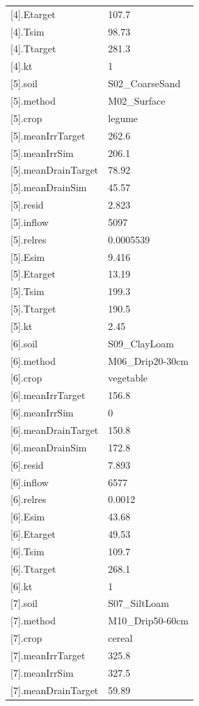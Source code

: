 {\begin{longtable}{p{}p{}}
{}[4].Etarget & 107.7\\
{}[4].Tsim & 98.73\\
{}[4].Ttarget & 281.3\\
{}[4].kt & 1\\
{}[5].soil & S02\_CoarseSand\\
{}[5].method & M02\_Surface\\
{}[5].crop & legume\\
{}[5].meanIrrTarget & 262.6\\
{}[5].meanIrrSim & 206.1\\
{}[5].meanDrainTarget & 78.92\\
{}[5].meanDrainSim & 45.57\\
{}[5].resid & 2.823\\
{}[5].inflow & 5097\\
{}[5].relres & 0.0005539\\
{}[5].Esim & 9.416\\
{}[5].Etarget & 13.19\\
{}[5].Tsim & 199.3\\
{}[5].Ttarget & 190.5\\
{}[5].kt & 2.45\\
{}[6].soil & S09\_ClayLoam\\
{}[6].method & M06\_Drip20-30cm\\
{}[6].crop & vegetable\\
{}[6].meanIrrTarget & 156.8\\
{}[6].meanIrrSim & 0\\
{}[6].meanDrainTarget & 150.8\\
{}[6].meanDrainSim & 172.8\\
{}[6].resid & 7.893\\
{}[6].inflow & 6577\\
{}[6].relres & 0.0012\\
{}[6].Esim & 43.68\\
{}[6].Etarget & 49.53\\
{}[6].Tsim & 109.7\\
{}[6].Ttarget & 268.1\\
{}[6].kt & 1\\
{}[7].soil & S07\_SiltLoam\\
{}[7].method & M10\_Drip50-60cm\\
{}[7].crop & cereal\\
{}[7].meanIrrTarget & 325.8\\
{}[7].meanIrrSim & 327.5\\
{}[7].meanDrainTarget & 59.89\\

\end{longtable}}
